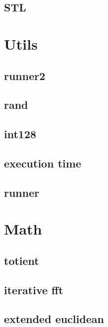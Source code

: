 \subsection{STL}
\raggedbottom
\hrulefill

\section{Utils}
\subsection{runner2}
\raggedbottom
\hrulefill
\subsection{rand}
\raggedbottom
\hrulefill
\subsection{  int128}
\raggedbottom
\hrulefill
\subsection{execution time}
\raggedbottom
\hrulefill
\subsection{runner}
\raggedbottom
\hrulefill

\section{Math}
\subsection{totient}
\raggedbottom
\hrulefill
\subsection{iterative fft}
\raggedbottom
\hrulefill
\subsection{extended euclidean}
\raggedbottom
\hrulefill
